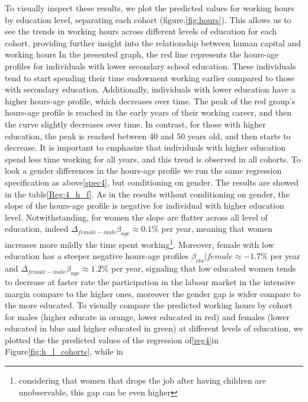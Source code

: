 \documentclass[12pt]{article}
\begin{document}
To visually inspect these results, we plot the predicted values for working hours by education level, separating each
cohort (figure.\ref{fig:hours}). This allows us to see the trends in working hours across different levels of education
for each cohort, providing further insight into the relationship between human capital and working hours
\newline
In the presented graph, the red line represents the hours-age profiles for individuals with lower secondary school
education. These individuals tend to start spending their time endowment working earlier compared to those with
secondary education. Additionally, individuals with lower education have a higher hours-age profile, which decreases
over time. The peak of the red group's hours-age profile is reached in the early years of their working career, and then
the curve slightly decreases over time. In contrast, for those with higher education, the peak is reached between 40 and
50 years old, and then starts to decrease. It is important to emphasize that individuals with higher education spend
less time working for all years, and this trend is observed in all cohorts.
\newline
To look a gender differences in the hours-age profile we run the same regression specification as above\ref{spec4}, but
conditioning on gender. The results are showed in the table\ref{Reg:4_h_f}. As in the results without conditioning on gender,
the slope of the hours-age profile is negative for individual with higher education level. Notwithstanding, for women
the slope are flatter across all level of education, indeed $\Delta_{female-male}\beta_{age} \approx 0.1\%$ per year,
meaning that women increases more mildly the time spent working\footnote{considering that women that drops the job after
having children are unobservable, this gap can be even higher}.
Moreover, female with low education has a steeper negative hours-age profiles $\beta_{eta}|female \approx -1.7\%$ per
year and $\Delta_{female-male}\beta_{age} \approx 1.2\%$ per year, signaling that low educated women tends
to decrease at faster rate the participation in the labour market in the intensive margin compare to the higher ones,
moreover the gender gap is wider compare to the more educated.  
\newline
To visually compare the predicted working hours by cohort for males (higher educate in orange, lower educated in red)
and females (lower educated in blue and higher educated in green) at different levels
of education, we plotted the the predicted values of the regression of\ref{reg4}in Figure\ref{fig:h_l_cohorts}, while in
\end{document}
